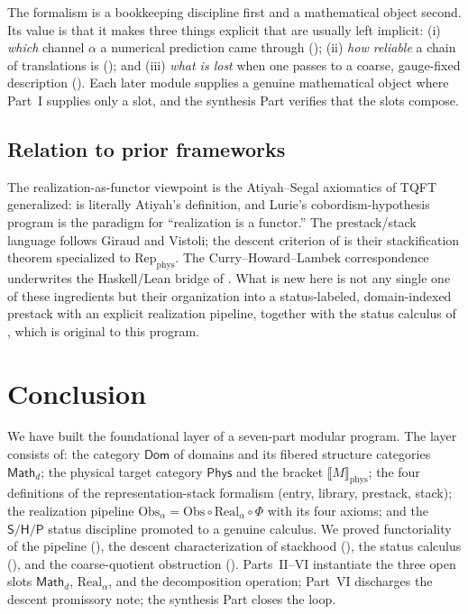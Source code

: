 \documentclass[12pt]{article}
\theoremstyle{definition}
\theoremstyle{remark}
\newcommand{\Dom}{\mathsf{Dom}}
\newcommand{\Math}{\mathsf{Math}}
\newcommand{\Phys}{\mathsf{Phys}}
\newcommand{\Real}{\mathrm{Real}}
\newcommand{\Obs}{\mathrm{Obs}}
\newcommand{\Repphys}{\mathrm{Rep}_{\mathrm{phys}}}
\newcommand{\physrep}[1]{\llbracket #1 \rrbracket_{\mathrm{phys}}}
\newcommand{\Sstat}{\mathsf{S}}
\newcommand{\Hstat}{\mathsf{H}}
\newcommand{\Pstat}{\mathsf{P}}
\begin{document}
The formalism is a bookkeeping discipline first and a mathematical object second.
Its value is that it makes three things explicit that are usually left implicit:
(i) \emph{which} channel $\alpha$ a numerical prediction came through
(); (ii) \emph{how reliable} a chain of translations is
(); and (iii) \emph{what is lost} when one passes to a coarse,
gauge-fixed description (). Each later module supplies a genuine
mathematical object where Part~I supplies only a slot, and the synthesis Part
verifies that the slots compose.

\subsection{Relation to prior frameworks}

The realization-as-functor viewpoint is the Atiyah--Segal axiomatics of TQFT
generalized:  is literally Atiyah's definition, and Lurie's
cobordism-hypothesis program is the paradigm for ``realization is a functor.''
The prestack/stack language follows Giraud and Vistoli; the descent criterion of
 is their stackification theorem specialized to $\Repphys$. The
Curry--Howard--Lambek correspondence underwrites the Haskell/Lean bridge of
. What is new here is not any single one of these ingredients but
their organization into a status-labeled, domain-indexed prestack with an
explicit realization pipeline, together with the status calculus of
, which is original to this program.

\section{Conclusion}
\label{sec:conclusion}

We have built the foundational layer of a seven-part modular program. The layer
consists of: the category $\Dom$ of domains and its fibered structure categories
$\Math_d$; the physical target category $\Phys$ and the bracket $\physrep{M}$;
the four definitions of the representation-stack formalism (entry, library,
prestack, stack); the realization pipeline
$\Obs_\alpha = \Obs\circ\Real_\alpha\circ\Phi$ with its four axioms; and the
$\Sstat/\Hstat/\Pstat$ status discipline promoted to a genuine calculus. We
proved functoriality of the pipeline (), the descent
characterization of stackhood (), the status calculus
(), and the coarse-quotient obstruction ().
Parts~II--VI instantiate the three open slots $\Math_d$, $\Real_\alpha$, and the
decomposition operation; Part~VI discharges the descent promissory note; the
synthesis Part closes the loop.
\end{document}
